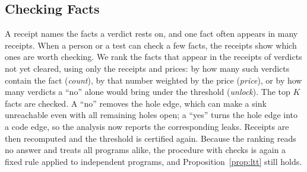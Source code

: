 \subsection{Checking Facts}
\label{sec:verify}
A receipt names the facts a verdict rests on, and one fact often appears in many receipts.
When a person or a test can check a few facts, the receipts show which ones are worth checking.
We rank the facts that appear in the receipts of verdicts not yet cleared, using only the receipts and prices: by how many such verdicts contain the fact (\emph{count}), by that number weighted by the price (\emph{price}), or by how many verdicts a ``no'' alone would bring under the threshold (\emph{unlock}).
The top $K$ facts are checked.
A ``no'' removes the hole edge, which can make a sink unreachable even with all remaining holes open; a ``yes'' turns the hole edge into a code edge, so the analysis now reports the corresponding leaks.
Receipts are then recomputed and the threshold is certified again.
Because the ranking reads no answer and treats all programs alike, the procedure with checks is again a fixed rule applied to independent programs, and Proposition~\ref{prop:ltt} still holds.
